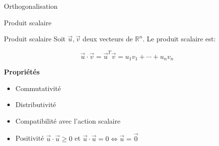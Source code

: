 \begin{parag}{Orthogonalisation}
    \begin{subparag}{Produit scalaire}
    \begin{definition}{Produit scalaire}
        Soit $\vec{u}, \vec{v}$ deux vecteurs de $\mathbb{R}^n$. Le produit scalaire est:
        \begin{formule}
            \[\vec{u}\cdot \vec{v} = \vec{u}^T\vec{v} = u_1v_1 + \cdots + u_nv_n\]
        \end{formule}
    \end{definition}
    \textbf{Propriétés}
    \begin{itemize}
        \item Commutativité
        \item Distributivité
        \item Compatibilité avec l'action scalaire
        \item Positivité $\vec{u}\cdot \vec{u} \geq 0$ et $\vec{u}\cdot \vec{u} = 0 \Leftrightarrow \vec{u} = \vec{0}$
    \end{itemize}
        

\end{subparag}
\end{parag}
